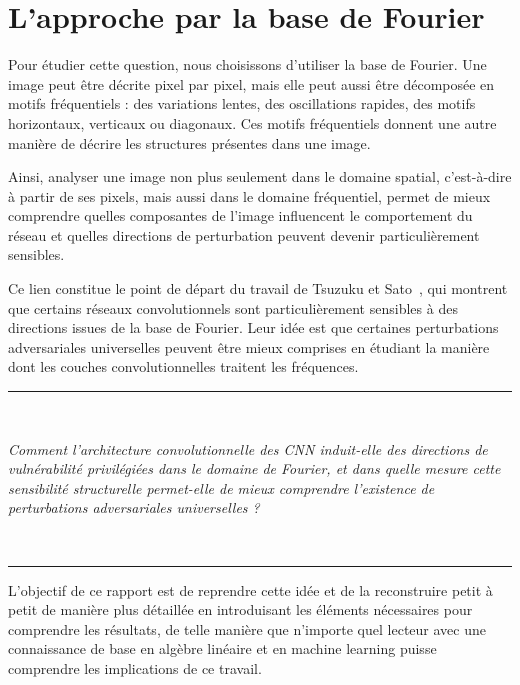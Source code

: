 \section*{L'approche par la base de Fourier}

Pour étudier cette question, nous choisissons d'utiliser la base de Fourier. Une image peut être 
décrite pixel par pixel, mais elle peut aussi être décomposée en motifs fréquentiels : des variations lentes, 
des oscillations rapides, des motifs horizontaux, verticaux ou diagonaux. Ces motifs fréquentiels donnent une 
autre manière de décrire les structures présentes dans une image.

Ainsi, analyser une image non plus seulement dans le domaine spatial, c'est-à-dire à partir de ses pixels, mais 
aussi dans le domaine fréquentiel, permet de mieux comprendre quelles composantes de l'image influencent le 
comportement du réseau et quelles directions de perturbation peuvent devenir particulièrement sensibles.

Ce lien constitue le point de départ du travail de Tsuzuku et Sato~\cite{tsuzuku2019structural}, qui montrent 
que certains réseaux convolutionnels sont particulièrement sensibles à des directions issues de la base de Fourier. 
Leur idée est que certaines perturbations adversariales universelles peuvent être mieux comprises en étudiant la 
manière dont les couches convolutionnelles traitent les fréquences.

\begin{center}
    \vspace{1em}
    \rule{0.4\textwidth}{0.4pt} \\
    \vspace{1em}
    \begin{minipage}{0.85\textwidth}
        \centering
        \large \itshape
        Comment l'architecture convolutionnelle des CNN induit-elle des directions de vulnérabilité privilégiées dans 
        le domaine de Fourier, et dans quelle mesure cette sensibilité structurelle permet-elle de mieux comprendre 
        l'existence de perturbations adversariales universelles ?
    \end{minipage} \\
    \vspace{1em}
    \rule{0.4\textwidth}{0.4pt}
    \vspace{1em}
\end{center}

L'objectif de ce rapport est de reprendre cette idée et de la reconstruire petit à petit de manière plus détaillée en 
introduisant les éléments nécessaires pour comprendre les résultats, de telle manière que n'importe quel lecteur avec une connaissance 
de base en algèbre linéaire et en machine learning puisse comprendre les implications de ce travail.

